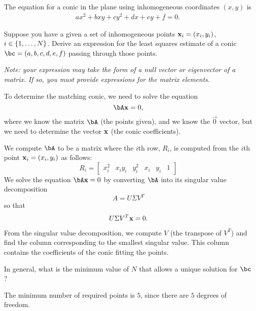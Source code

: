 \begin{problem}
  The equation for a conic in the plane using inhomogeneous
  coordinates $(x, y)$ is
  \begin{align}
    ax^2 + bxy + cy^2 + dx + ey + f = 0.~\label{eq:2.1}
  \end{align}

  \begin{enumalph}
    \item Suppose you have a given a set of inhomogeneous points
      $\mathbf{x}_i = (x_i, y_i)$, $i \in \left\{1, \ldots, N\right\}$.
      Derive an expression for the least squares estimate
      of a conic $\bc = (a, b, c, d, e, f)$ passing through those points.
      
      \step
      \emph{
        Note: your expression may take the form of a
        null vector or eigenvector of a matrix.
        If so, you must provide expressions
        for the matrix elements.
      }
      \begin{Answer}
        To determine the matching conic, we need to solve the equation
        \[
          \bA\bx = 0,
        \]
        where we know the matrix $\bA$ (the points given),
        and we know the $\vec{0}$ vector, but we need to determine
        the vector $\mathbf{x}$ (the conic coefficients).

        \step
        We compute $\bA$ to be a matrix where the $i$th row, $R_i$, is
        computed from the $i$th point $\mathbf{x}_i = (x_i, y_i)$ as follows:
        \[ 
          R_i = \begin{bmatrix}
            x_i^2 & x_iy_i & y_i^2 & x_i & y_i & 1
          \end{bmatrix}
        \]
        We solve the equation $\bA\bx = 0$ by converting $\bA$ into
        its singular value decomposition
        \[
          A = U \Sigma V^T
        \]
        so that
        \[
          U \Sigma V^T \mathbf{x} = 0.
        \]

        \step
        From the singular value decomposition, we compute $V$
        (the transpose of $V^T$) and find the column corresponding
        to the smallest singular value.
        This column contains the coefficients of the conic
        fitting the points. 
      \end{Answer}
    \item In general, what is the minimum value of $N$ that
      allows a unique solution for $\bc$?
      \begin{Answer}
        The minimum number of required points is $5$,
        since there are $5$ degrees of freedom.
      \end{Answer}


\end{enumalph}
\end{problem}
